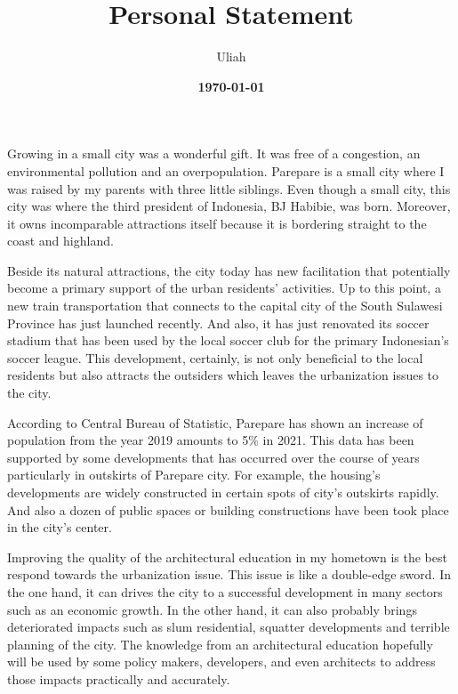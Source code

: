 \documentclass[11pt]{simart} %
\title{
\textbf{Personal Statement} \\
} %
\date{\textbf{\today}}
\author{Uliah}
\begin{document}


Growing in a small city was a wonderful gift. It was free of a congestion, an environmental pollution and an overpopulation. Parepare is a small city where I was raised by my parents with three little siblings. Even though a small city, this city was where the third president of Indonesia, BJ Habibie, was born.
Moreover, it owns incomparable attractions itself because it is bordering straight to the coast and highland.

Beside its natural attractions, the city today has new facilitation that potentially become a primary support of the urban residents' activities.
Up to this point, a new train transportation that connects to the capital city of the South Sulawesi Province has just launched recently.
And also, it has just renovated its soccer stadium that has been used by the local soccer club for the primary Indonesian's soccer league.
This development, certainly, is not only beneficial to the local residents but also attracts the outsiders which leaves the urbanization issues to the city.

According to Central Bureau of Statistic, Parepare has shown an increase of population from the year 2019 amounts to 5\% in 2021. This data has been supported by some developments that has occurred over the course of years particularly in outskirts of Parepare city. For example, the housing's developments are widely constructed in certain spots of city's outskirts rapidly. And also a dozen of public spaces or building constructions have been took place in the city's center.

Improving the quality of the architectural education in my hometown is the best respond towards the urbanization issue.
This issue is like a double-edge sword. In the one hand, it can drives the city to a successful development in many sectors such as an economic growth. In the other hand, it can also probably brings deteriorated impacts such as slum residential, squatter developments and terrible planning of the city. The knowledge from an architectural education hopefully will be used by some policy makers, developers, and even architects to address those impacts practically and accurately.
\end{document}
